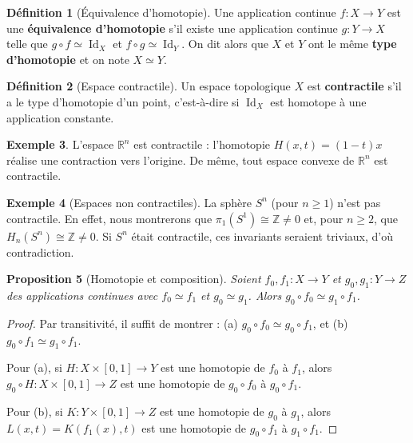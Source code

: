 \documentclass[12pt,a4paper,openany]{book}
\theoremstyle{definition}
\newtheorem{definition}{Définition}[chapter]
\newtheorem{exemple}[definition]{Exemple}
\theoremstyle{plain}
\newtheorem{proposition}[definition]{Proposition}
\theoremstyle{remark}
\newcommand{\Z}{\mathbb{Z}}
\newcommand{\R}{\mathbb{R}}
\DeclareMathOperator{\Id}{Id}
\begin{document}
\begin{definition}[Équivalence d'homotopie]\label{def:equiv-homotopie}
Une application continue $f : X \to Y$ est une \textbf{équivalence d'homotopie}
s'il existe une application continue $g : Y \to X$ telle que
$g \circ f \simeq \Id_X$ et $f \circ g \simeq \Id_Y$. On dit alors que $X$ et
$Y$ ont le même \textbf{type d'homotopie} et on note
$X \simeq Y$.
\end{definition}

\begin{definition}[Espace contractile]\label{def:contractile}
Un espace topologique $X$ est \textbf{contractile} s'il a le type d'homotopie
d'un point, c'est-à-dire si $\Id_X$ est homotope à une application constante.
\end{definition}

\begin{exemple}\label{ex:Rn-contractile}
L'espace $\R^n$ est contractile : l'homotopie $H(x,t) = (1-t)x$ réalise une
contraction vers l'origine. De même, tout espace convexe de $\R^n$ est
contractile.
\end{exemple}

\begin{exemple}[Espaces non contractiles]\label{ex:non-contractile}
La sphère $S^n$ (pour $n \geqslant 1$) n'est pas contractile. En effet, nous
montrerons que $\pi_1(S^1) \cong \Z \neq 0$ et, pour $n \geqslant 2$, que
$H_n(S^n) \cong \Z \neq 0$. Si $S^n$ était contractile, ces invariants seraient
triviaux, d'où contradiction.
\end{exemple}

\begin{proposition}[Homotopie et composition]\label{prop:homotopie-composition}
Soient $f_0, f_1 : X \to Y$ et $g_0, g_1 : Y \to Z$ des applications continues
avec $f_0 \simeq f_1$ et $g_0 \simeq g_1$. Alors $g_0 \circ f_0 \simeq g_1 \circ f_1$.
\end{proposition}

\begin{proof}
Par transitivité, il suffit de montrer : (a) $g_0 \circ f_0 \simeq g_0 \circ f_1$,
et (b) $g_0 \circ f_1 \simeq g_1 \circ f_1$.

Pour (a), si $H : X \times [0,1] \to Y$ est une homotopie de $f_0$ à $f_1$,
alors $g_0 \circ H : X \times [0,1] \to Z$ est une homotopie de $g_0 \circ f_0$
à $g_0 \circ f_1$.

Pour (b), si $K : Y \times [0,1] \to Z$ est une homotopie de $g_0$ à $g_1$,
alors $L(x,t) = K(f_1(x), t)$ est une homotopie de $g_0 \circ f_1$ à
$g_1 \circ f_1$.
\end{proof}
\end{document}
